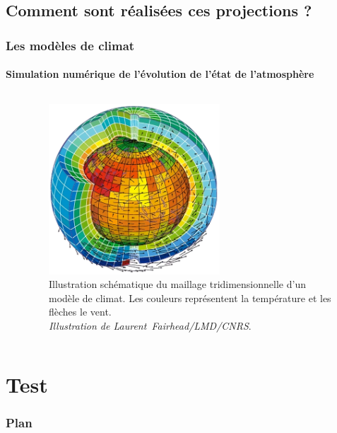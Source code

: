 \documentclass[aspectratio=169, usepdftitle=false, xcolor={dvipsnames}, 9pt]{beamer}
\begin{document}
\subsection[Méthodologies]{Comment sont réalisées ces projections ?}
\makesubsecslide

\begin{frame}[c]
    \frametitle{Les modèles de climat}
    \framesubtitle{Simulation numérique de l'évolution de l'état de l'atmosphère}
    \begin{columns}
        \begin{column}{0.5\textwidth}
            
        \end{column}
        \begin{column}{0.5\textwidth}
            \begin{figure}[t]
                \centering
                \includegraphics[width=0.6\textwidth]{Figures/maillage_upscaled_x4_2.png}
                \captionsetup{width=0.8\textwidth}
                \caption{Illustration schématique du maillage tridimensionnelle d'un modèle de climat. Les couleurs représentent la température et les flèches
                le vent.\\\textit{Illustration de \mbox{Laurent Fairhead/LMD/CNRS}}.}
            \end{figure}
        \end{column}
    \end{columns} 
\end{frame}

\section{Test}

\begin{frame}[t]
    \frametitle{Plan}
    \tableofcontents[currentsection]
\end{frame}
\end{document}
